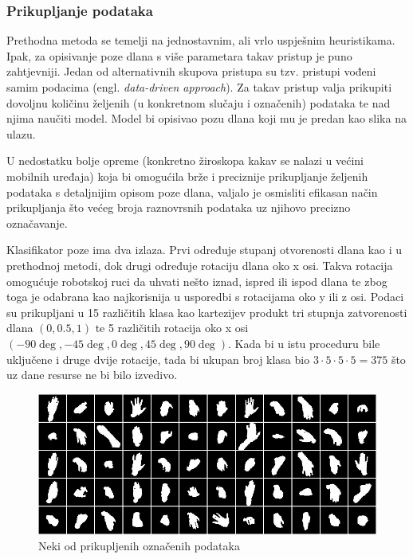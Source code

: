 \documentclass[times, utf8, diplomski, numeric]{fer}
\begin{document}
\subsubsection{Prikupljanje podataka}
Prethodna metoda se temelji na jednostavnim, ali vrlo uspješnim heuristikama. Ipak, za opisivanje poze dlana s više parametara takav pristup je puno zahtjevniji. Jedan od alternativnih skupova pristupa su tzv. pristupi vođeni samim podacima (engl. \textit{data-driven approach}). Za takav pristup valja prikupiti dovoljnu količinu željenih (u konkretnom slučaju i označenih) podataka te nad njima naučiti model. Model bi opisivao pozu dlana koji mu je predan kao slika na ulazu.

U nedostatku bolje opreme (konkretno žiroskopa kakav se nalazi u većini mobilnih uređaja) koja bi omogućila brže i preciznije prikupljanje željenih podataka s detaljnijim opisom poze dlana, valjalo je osmisliti efikasan način prikupljanja što većeg broja raznovrsnih podataka uz njihovo precizno označavanje.

Klasifikator poze ima dva izlaza. Prvi određuje stupanj otvorenosti dlana kao i u prethodnoj metodi, dok drugi određuje rotaciju dlana oko x osi. Takva rotacija omogućuje robotskoj ruci da uhvati nešto iznad, ispred ili ispod dlana te zbog toga je odabrana kao najkorisnija u usporedbi s rotacijama oko y ili z osi. Podaci su prikupljani u 15 različitih klasa kao kartezijev produkt tri stupnja zatvorenosti dlana $ (0,0.5,1)$ te 5 različitih rotacija oko x osi $(-90\deg, -45\deg, 0\deg, 45\deg, 90\deg)$. Kada bi u istu proceduru bile uključene i druge dvije rotacije, tada bi ukupan broj klasa bio $3\cdot5\cdot5\cdot5 =375$ što uz dane resurse ne bi bilo izvedivo.

\begin{figure}[h!]
\centering
\includegraphics[width = 1.0\textwidth]{detekcija/dataset}
\caption{Neki od prikupljenih označenih podataka} \label{covnet-dataset}
\end{figure}
\end{document}
